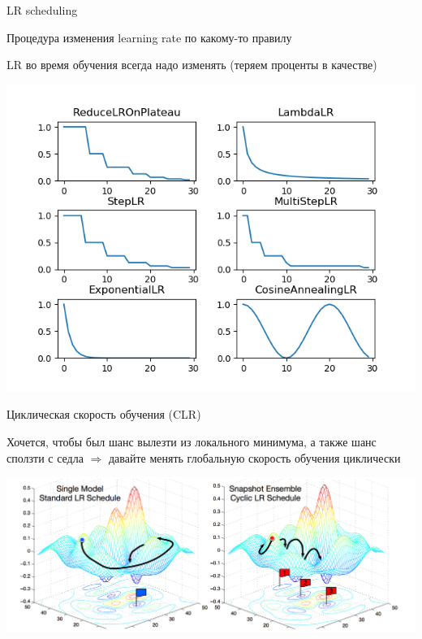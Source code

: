 \documentclass[notes,12pt, aspectratio=169]{beamer}
\newenvironment{wideitemize}{\itemize\addtolength{\itemsep}{10pt}}{\enditemize}
\begin{document}
\begin{frame}{LR scheduling}
	\begin{wideitemize}
		\item Процедура изменения learning rate по какому-то правилу
		\item LR во время обучения всегда надо изменять (теряем проценты в качестве)
	\end{wideitemize}
	\begin{center}
		\includegraphics[width=0.5\paperwidth]{lr_sheduling.png}
	\end{center}
\end{frame}


\begin{frame}{Циклическая скорость обучения (CLR)}
	\begin{wideitemize}
		\item Хочется, чтобы был шанс вылезти из локального минимума, а также шанс сползти с седла $\Rightarrow$ давайте менять глобальную скорость обучения циклически
	\end{wideitemize}
	\begin{center}
		\includegraphics[width=0.75\paperwidth]{cycle_sgd.png}
	\end{center}
\end{frame}
\end{document}
